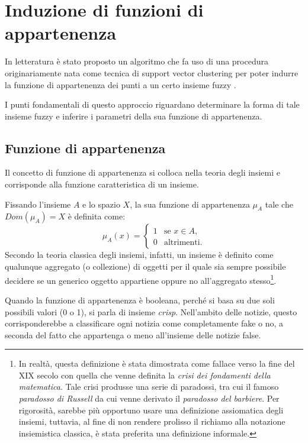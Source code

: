\documentclass[12pt]{report}
\theoremstyle{definition}
\begin{document}
\section{Induzione di funzioni di appartenenza} \label{induzione}
In letteratura è stato proposto un algoritmo che fa uso di una procedura originariamente nata come tecnica di support vector clustering per poter indurre la funzione di appartenenza dei punti a un certo insieme fuzzy \cite{1}.

I punti fondamentali di questo approccio riguardano determinare la forma di tale insieme fuzzy e inferire i parametri della sua funzione di appartenenza.

\subsection{Funzione di appartenenza} \label{membership}
Il concetto di funzione di appartenenza si colloca nella teoria degli insiemi e corrisponde alla funzione caratteristica di un insieme.

Fissando l'insieme $A$ e lo spazio $X$, la sua funzione di appartenenza $\mu_A$ tale che $Dom(\mu_A) = X$ è definita come:
\begin{equation}
    \mu_A(x)= \begin{cases} 1 & \mbox{se } x \in A, \\ 0 & \mbox{altrimenti.} \end{cases}
\end{equation}
Secondo la teoria classica degli insiemi, infatti, un insieme è definito come qualunque aggregato (o collezione) di oggetti per il quale sia sempre possibile decidere se un generico oggetto appartiene oppure no all'aggregato stesso\footnote{In realtà, questa definizione è stata dimostrata come fallace verso la fine del XIX secolo con quella che venne definita la \textit{crisi dei fondamenti della matematica}. Tale crisi produsse una serie di paradossi, tra cui il famoso \textit{paradosso di Russell} da cui venne derivato il \textit{paradosso del barbiere}. Per rigorosità, sarebbe più opportuno usare una definizione assiomatica degli insiemi, tuttavia, al fine di non rendere prolisso il richiamo alla notazione insiemistica classica, è stata preferita una definizione informale.}.

Quando la funzione di appartenenza è booleana, perché si basa su due soli possibili valori (0 o 1), si parla di insieme \textit{crisp}. Nell'ambito delle notizie, questo corrisponderebbe a classificare ogni notizia come completamente fake o no, a seconda del fatto che appartenga o meno all'insieme delle notizie false.
\end{document}
